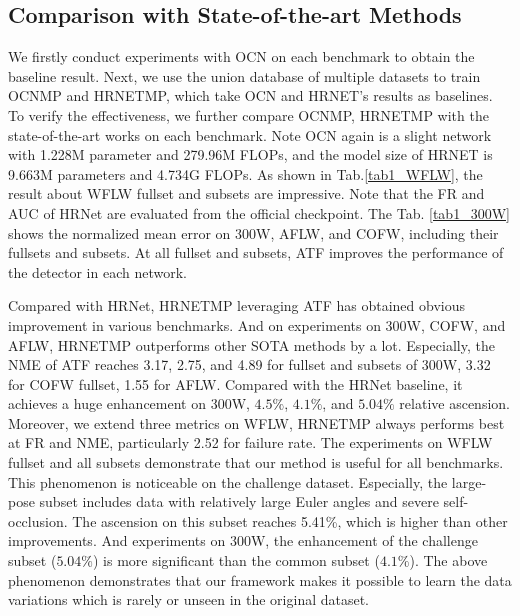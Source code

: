 \documentclass[journal,transmag]{IEEEtran}
\begin{document}


\subsection{Comparison with State-of-the-art Methods}
We firstly conduct experiments with OCN on each benchmark to obtain the baseline result.
Next, we use the union database of multiple datasets to train OCNMP and HRNETMP, which take OCN and HRNET\cite{HRNET}'s results as baselines.
To verify the effectiveness, we further compare OCNMP, HRNETMP with the state-of-the-art works on each benchmark.
Note OCN again is a slight network with 1.228M parameter and 279.96M FLOPs, and the model size of HRNET is 9.663M parameters and 4.734G FLOPs.
As shown in Tab.\ref{tab1_WFLW}, the result about WFLW fullset and subsets are impressive.
Note that the FR and AUC of HRNet are evaluated from the official checkpoint.
The Tab. \ref{tab1_300W} shows the normalized mean error on 300W, AFLW, and COFW, including their fullsets and subsets.
At all fullset and subsets, ATF improves the performance of the detector in each network.

Compared with HRNet, HRNETMP leveraging ATF has obtained obvious improvement in various benchmarks.
And on experiments on 300W, COFW, and AFLW, HRNETMP outperforms other SOTA methods by a lot. 
Especially, the NME of ATF reaches 3.17, 2.75, and 4.89 for fullset and subsets of 300W\cite{300W}, 3.32 for COFW fullset, 1.55 for AFLW.
Compared with the HRNet baseline, it achieves a huge enhancement on 300W, $4.5\%$, $4.1\%$, and $5.04\%$ relative ascension.
Moreover, we extend three metrics on WFLW, HRNETMP always performs best at FR and NME, particularly 2.52 for failure rate.
The experiments on WFLW fullset and all subsets demonstrate that our method is useful for all benchmarks.
This phenomenon is noticeable on the challenge dataset.
Especially, the large-pose subset includes data with relatively large Euler angles and severe self-occlusion.
The ascension on this subset reaches 5.41\%, which is higher than other improvements.
And experiments on 300W, the enhancement of the challenge subset ($5.04\%$) is more significant than the common subset ($4.1\%$).
The above phenomenon demonstrates that our framework makes it possible to learn the data variations which is rarely or unseen in the original dataset.
\end{document}
